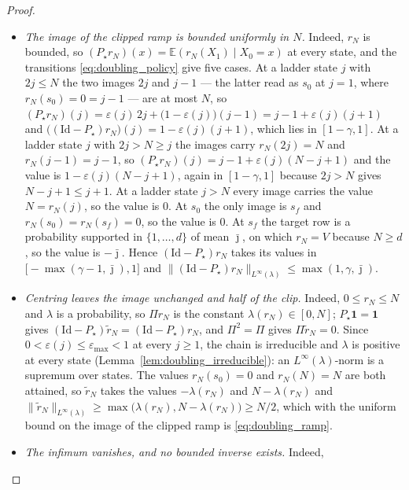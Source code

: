 \begin{proof}
\begin{itemize}
    \item \emph{The image of the clipped ramp is bounded uniformly in $N$.} Indeed, $r_N$ is
    bounded, so $(P_\star r_N)(x)=\mathbb E(r_N(X_1)\mid X_0=x)$ at every state, and the
    transitions \eqref{eq:doubling_policy} give five cases. At a ladder state $j$ with
    $2j\leq N$ the two images $2j$ and $j-1$ --- the latter read as $s_0$ at $j=1$, where
    $r_N(s_0)=0=j-1$ --- are at most $N$, so
    $(P_\star r_N)(j)=\varepsilon(j)\,2j+\bigl(1-\varepsilon(j)\bigr)(j-1)=j-1+\varepsilon(j)(j+1)$
    and $\bigl((\mathrm{Id}-P_\star)r_N\bigr)(j)=1-\varepsilon(j)(j+1)$, which lies in
    $[1-\gamma,1]$. At a ladder state $j$ with $2j>N\geq j$ the images carry $r_N(2j)=N$ and
    $r_N(j-1)=j-1$, so $(P_\star r_N)(j)=j-1+\varepsilon(j)(N-j+1)$ and the value is
    $1-\varepsilon(j)(N-j+1)$, again in $[1-\gamma,1]$ because $2j>N$ gives
    $N-j+1\leq j+1$. At a ladder state $j>N$ every image carries the value $N=r_N(j)$, so the
    value is $0$. At $s_0$ the only image is $s_f$ and $r_N(s_0)=r_N(s_f)=0$, so the value is
    $0$. At $s_f$ the target row is a probability supported in $\{1,\dots,d\}$ of mean
    $\bar\jmath$, on which $r_N=V$ because $N\geq d$, so the value is $-\bar\jmath$. Hence
    $(\mathrm{Id}-P_\star)r_N$ takes its values in $\bigl[-\max(\gamma-1,\bar\jmath),1\bigr]$
    and $\|(\mathrm{Id}-P_\star)r_N\|_{L^\infty(\lambda)}\leq\max(1,\gamma,\bar\jmath)$.
    \item \emph{Centring leaves the image unchanged and half of the clip.} Indeed,
    $0\leq r_N\leq N$ and $\lambda$ is a probability, so $\Pi r_N$ is the constant
    $\lambda(r_N)\in[0,N]$; $P_\star\mathbf 1=\mathbf 1$ gives
    $(\mathrm{Id}-P_\star)\tilde r_N=(\mathrm{Id}-P_\star)r_N$, and $\Pi^2=\Pi$ gives
    $\Pi\tilde r_N=0$. Since $0<\varepsilon(j)\leq\varepsilon_{\max}<1$ at every $j\geq1$, the
    chain is irreducible and $\lambda$ is positive at every state
    (Lemma~\ref{lem:doubling_irreducible}): an $L^\infty(\lambda)$-norm is a
    supremum over states. The values $r_N(s_0)=0$ and $r_N(N)=N$ are both attained, so
    $\tilde r_N$ takes the values $-\lambda(r_N)$ and $N-\lambda(r_N)$ and
    $\|\tilde r_N\|_{L^\infty(\lambda)}\geq\max\bigl(\lambda(r_N),N-\lambda(r_N)\bigr)\geq N/2$,
    which with the uniform bound on the image of the clipped ramp is \eqref{eq:doubling_ramp}.
    \item \emph{The infimum vanishes, and no bounded inverse exists.} Indeed,

\end{itemize}
\end{proof}
